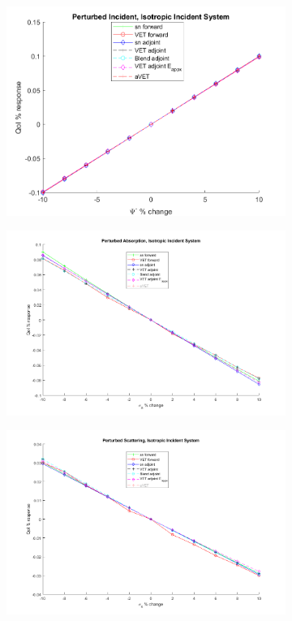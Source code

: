 \documentclass[12pt]{report}
\begin{document}
\begin{figure}[H]
\centering
\begin{subfigure}{.5\textwidth}
  \centering
  \includegraphics[width=.98\linewidth]{figures2/24incSens.png}
\end{subfigure}%
\begin{subfigure}{.5\textwidth}
  \centering
  \includegraphics[width=.98\linewidth]{figures2/24sigaSensNoavet.png}
\end{subfigure}
%
\begin{subfigure}{.5\textwidth}
  \centering
  \includegraphics[width=.98\linewidth]{figures2/24sigsSensNoavet.png}

\end{subfigure}
\end{figure}
\end{document}
